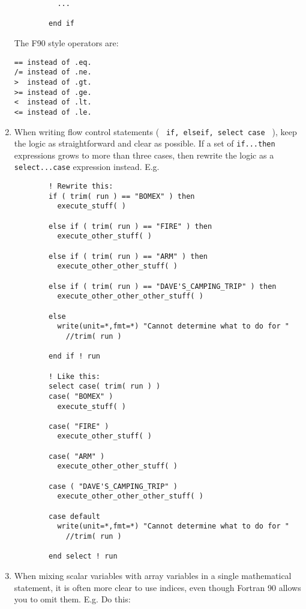 \documentclass[letterpaper,12pt]{article}
\begin{document}
\begin{enumerate}
\begin{verbatim}
          ...

        end if

\end{verbatim}

The F90 style operators are:
\newline

\begin{verbatim}
== instead of .eq.
/= instead of .ne.
>  instead of .gt.
>= instead of .ge.
<  instead of .lt.
<= instead of .le.
\end{verbatim}


\item When writing flow control statements 
( \texttt{ if, elseif, select case } ), keep the logic as straightforward and
clear as possible.  If a set of \texttt{if...then} expressions grows to more
than three cases, then rewrite the logic as a \texttt{select...case} expression
instead. E.g.

\begin{verbatim}
        ! Rewrite this:
        if ( trim( run ) == "BOMEX" ) then
          execute_stuff( )

        else if ( trim( run ) == "FIRE" ) then
          execute_other_stuff( )

        else if ( trim( run ) == "ARM" ) then
          execute_other_other_stuff( ) 

        else if ( trim( run ) == "DAVE'S_CAMPING_TRIP" ) then
          execute_other_other_other_stuff( ) 

        else
          write(unit=*,fmt=*) "Cannot determine what to do for "
            //trim( run )

        end if ! run

        ! Like this:
        select case( trim( run ) )
        case( "BOMEX" )
          execute_stuff( )

        case( "FIRE" )
          execute_other_stuff( )

        case( "ARM" )
          execute_other_other_stuff( )
 
        case ( "DAVE'S_CAMPING_TRIP" ) 
          execute_other_other_other_stuff( ) 

        case default
          write(unit=*,fmt=*) "Cannot determine what to do for "
            //trim( run )

        end select ! run

\end{verbatim}

\item When mixing scalar variables with array variables in a single
mathematical statement, it is often more clear to use indices, even
though Fortran 90 allows you to omit them. \newline
E.g. Do this:


\end{enumerate}
\end{document}
